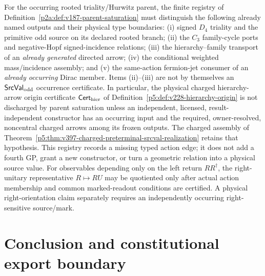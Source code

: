 \documentclass[12pt,a4paper]{article}
\begin{document}
\begin{remark}
\label{p2a:rem:v3225-charged-origin-registry}
For the occurring rooted triality/Hurwitz parent, the finite registry of
Definition~\ref{p2a:def:v187-parent-saturation} must distinguish the
following already named outputs and their physical type boundaries:
(i) signed $D_4$ triality and the primitive odd source on its declared
rooted branch; (ii) the $C_3$ family-cycle ports and negative-Hopf
signed-incidence relations; (iii) the hierarchy--family transport of an
\emph{already generated} directed arrow; (iv) the conditional weighted
mass/incidence assembly; and (v) the same-action fermion-jet consumer of
an \emph{already occurring} Dirac member.  Items (ii)--(iii) are not
by themselves an $\mathsf{SrcVal}_{\rm odd}$ occurrence certificate.
In particular, the physical charged hierarchy-arrow origin certificate
$\mathsf{Cert}_{\rm hier}$ of
Definition~\ref{p5:def:v228-hierarchy-origin} is not discharged by
parent saturation unless an independent, licensed, result-independent
constructor has an occurring input and the required, owner-resolved,
noncentral charged arrows among its frozen outputs.  The charged
assembly of Theorem~\ref{p5:thm:v397-charged-preterminal-srcval-realization}
retains that hypothesis.  This registry records a missing typed action
edge; it does not add a fourth GP, grant a new constructor, or turn a
geometric relation into a physical source value.
For observables depending only on the left return $RR^\dagger$, the
right-unitary representative $R\mapsto RU$ may be quotiented only after
actual action membership and common marked-readout conditions are
certified.  A physical right-orientation claim separately requires an
independently occurring right-sensitive source/mark.
\end{remark}

\section{Conclusion and constitutional export boundary}
\label{p2:sec:conclusion}
\end{document}
